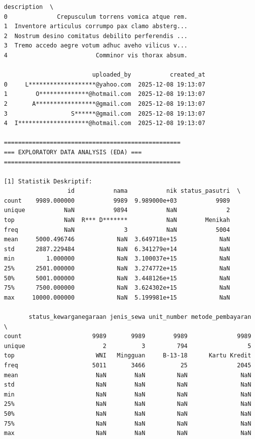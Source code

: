 \begin{lstlisting}[caption={Output 11}]
                                         description  \
0              Crepusculum torrens vomica atque rem.   
1  Inventore articulus corrumpo pax clamo absterg...   
2  Nostrum desino comitatus debilito perferendis ...   
3  Tremo accedo aegre votum adhuc aveho vilicus v...   
4                         Comminor vis thorax absum.   

                         uploaded_by           created_at  
0     L*******************@yahoo.com  2025-12-08 19:13:07  
1        O**************@hotmail.com  2025-12-08 19:13:07  
2       A*****************@gmail.com  2025-12-08 19:13:07  
3                  S******@gmail.com  2025-12-08 19:13:07  
4  I********************@hotmail.com  2025-12-08 19:13:07  

==================================================
=== EXPLORATORY DATA ANALYSIS (EDA) ===
==================================================

[1] Statistik Deskriptif:
                  id           nama           nik status_pasutri  \
count    9989.000000           9989  9.989000e+03           9989   
unique           NaN           9894           NaN              2   
top              NaN  R*** D*******           NaN        Menikah   
freq             NaN              3           NaN           5004   
mean     5000.496746            NaN  3.649718e+15            NaN   
std      2887.229484            NaN  6.341279e+14            NaN   
min         1.000000            NaN  3.100037e+15            NaN   
25%      2501.000000            NaN  3.274772e+15            NaN   
50%      5001.000000            NaN  3.448126e+15            NaN   
75%      7500.000000            NaN  3.624302e+15            NaN   
max     10000.000000            NaN  5.199981e+15            NaN   

       status_kewarganegaraan jenis_sewa unit_number metode_pembayaran  \
count                    9989       9989        9989              9989   
unique                      2          3         794                 5   
top                       WNI   Mingguan     B-13-18      Kartu Kredit   
freq                     5011       3466          25              2045   
mean                      NaN        NaN         NaN               NaN   
std                       NaN        NaN         NaN               NaN   
min                       NaN        NaN         NaN               NaN   
25%                       NaN        NaN         NaN               NaN   
50%                       NaN        NaN         NaN               NaN   
75%                       NaN        NaN         NaN               NaN   
max                       NaN        NaN         NaN               NaN   


\end{lstlisting}
